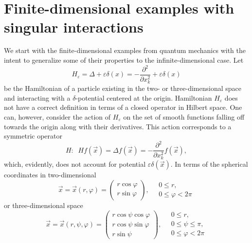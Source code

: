 \documentclass[12pt]{article}
\newcommand{\Hh}{H}
\newcommand{\ve}{\varepsilon}
\begin{document}
\section{Finite-dimensional examples with
         singular interactions}
    We start with the finite-dimensional examples
    from quantum mechanics
	with the intent to generalize some of their properties
	to the infinite-dimensional case.
	Let
\begin{equation*}
    \Hh_{\ve} = \Delta + \ve \delta(x) = - %
	\frac{\partial^{2}}{\partial x_{k}^{2}}
	    + \ve \delta(x)
\end{equation*}
	be the Hamiltonian of a particle existing in the two- or three-dimensional space
	and interacting with a
$ \delta $-potential centered at the origin.
	Hamiltonian
$ \Hh_{\ve} $
	does not have a correct definition in terms of a closed operator
	in Hilbert space.
	One can, however, consider the action of
$ \Hh_{\ve} $
	on the set of smooth functions falling off towards the origin along with their derivatives.
	This action corresponds to a symmetric operator
\begin{equation*}
    \Hh: \;\; \Hh f(\vec{x}) = \Delta f(\vec{x}) = - %
	\frac{\partial^{2}}{\partial x_{k}^{2}} f(\vec{x}) ,
\end{equation*}
	which, evidently, does not account for potential
$ \ve \delta(\vec{x}) $.
	In terms of the spherical coordinates in two-dimensional
\begin{equation*}
    \vec{x} = \vec{x}(r,\varphi)
    = \begin{pmatrix} r\cos\varphi\\
        r\sin\varphi
        \end{pmatrix}, \quad
    \begin{array}{l}
	0 \leq r,\\ 0 \leq\varphi < 2\pi
    \end{array}
\end{equation*}
	or three-dimensional space
\begin{equation}
\label{sphchange}
    \vec{x} = \vec{x}(r,\psi,\varphi)
    = \begin{pmatrix} r\cos\psi \cos\varphi\\
        r\cos\psi \sin\varphi\\
        r\sin\psi
        \end{pmatrix}, \quad
    \begin{array}{l}
	0 \leq r, \\
	0 \leq\psi \leq\pi,\\
	0 \leq\varphi < 2\pi
    \end{array}
\end{equation}
\end{document}
